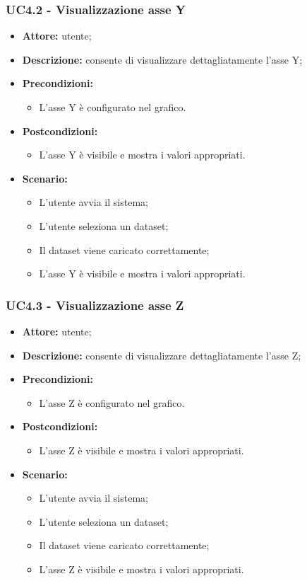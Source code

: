 \subsubsection{UC4.2 - Visualizzazione asse Y}
\begin{itemize}
    \item \textbf{Attore:} utente;
    \item \textbf{Descrizione:} consente di visualizzare dettagliatamente l'asse Y;
    \item \textbf{Precondizioni:} 
    \begin{itemize}
        \item L'asse Y è configurato nel grafico.
    \end{itemize}
    \item \textbf{Postcondizioni:} 
    \begin{itemize}
        \item L'asse Y è visibile e mostra i valori appropriati.
    \end{itemize}
    \item \textbf{Scenario:} 
    \begin{itemize}
        \item L'utente avvia il sistema;
        \item L'utente seleziona un dataset;
        \item Il dataset viene caricato correttamente;
        \item L'asse Y è visibile e mostra i valori appropriati.
    \end{itemize}
\end{itemize}
\subsubsection{UC4.3 - Visualizzazione asse Z}
\begin{itemize}
    \item \textbf{Attore:} utente;
    \item \textbf{Descrizione:} consente di visualizzare dettagliatamente l'asse Z;
    \item \textbf{Precondizioni:} 
    \begin{itemize}
        \item L'asse Z è configurato nel grafico.
    \end{itemize}
    \item \textbf{Postcondizioni:} 
    \begin{itemize}
        \item L'asse Z è visibile e mostra i valori appropriati.
    \end{itemize}
    \item \textbf{Scenario:} 
    \begin{itemize}
        \item L'utente avvia il sistema;
        \item L'utente seleziona un dataset;
        \item Il dataset viene caricato correttamente;
        \item L'asse Z è visibile e mostra i valori appropriati.
    \end{itemize}
\end{itemize}
\newpage
